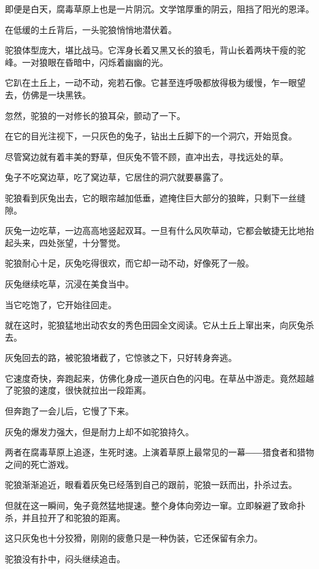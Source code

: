 
\begin{this_body}

即便是白天，腐毒草原上也是一片阴沉。文学馆厚重的阴云，阻挡了阳光的恩泽。

在低缓的土丘背后，一头驼狼悄悄地潜伏着。

驼狼体型庞大，堪比战马。它浑身长着又黑又长的狼毛，背山长着两块干瘦的驼峰。一对狼眼在昏暗中，闪烁着幽幽的光。

它趴在土丘上，一动不动，宛若石像。它甚至连呼吸都放得极为缓慢，乍一眼望去，仿佛是一块黑铁。

忽然，驼狼的一对修长的狼耳朵，颤动了一下。

在它的目光注视下，一只灰色的兔子，钻出土丘脚下的一个洞穴，开始觅食。

尽管窝边就有着丰美的野草，但灰兔不管不顾，直冲出去，寻找远处的草。

兔子不吃窝边草，吃了窝边草，它居住的洞穴就要暴露了。

驼狼看到灰兔出去，它的眼帘越加低垂，遮掩住巨大部分的狼眸，只剩下一丝缝隙。

灰兔一边吃草，一边高高地竖起双耳。一旦有什么风吹草动，它都会敏捷无比地抬起头来，四处张望，十分警觉。

驼狼耐心十足，灰兔吃得很欢，而它却一动不动，好像死了一般。

灰兔继续吃草，沉浸在美食当中。

当它吃饱了，它开始往回走。

就在这时，驼狼猛地出动农女的秀色田园全文阅读。它从土丘上窜出来，向灰兔杀去。

灰兔回去的路，被驼狼堵截了，它惊骇之下，只好转身奔逃。

它速度奇快，奔跑起来，仿佛化身成一道灰白色的闪电。在草丛中游走。竟然超越了驼狼的速度，很快就拉出一段距离。

但奔跑了一会儿后，它慢了下来。

灰兔的爆发力强大，但是耐力上却不如驼狼持久。

两者在腐毒草原上追逐，生死时速。上演着草原上最常见的一幕――猎食者和猎物之间的死亡游戏。

驼狼渐渐追近，眼看着灰兔已经落到自己的跟前，驼狼一跃而出，扑杀过去。

但就在这一瞬间，兔子竟然猛地提速。整个身体向旁边一窜。立即躲避了致命扑杀，并且拉开了和驼狼的距离。

这只灰兔也十分狡猾，刚刚的疲惫只是一种伪装，它还保留有余力。

驼狼没有扑中，闷头继续追击。


\end{this_body}
